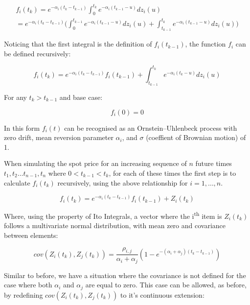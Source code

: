 \documentclass{article}
\begin{document}
\begin{eqnarray}
    \nonumber
    f_i(t_k) = e^{-\alpha_i(t_k - t_{k-1})} \int_0^{t_k} e^{-\alpha_i(t_{k-1}-u)} dz_i(u) \\
        = e^{-\alpha_i(t_k - t_{k-1})} \biggl(\int_0^{t_{k-1}} e^{-\alpha_i(t_{k-1}-u)} dz_i(u) +
        \int_{t_{k-1}}^{t_k} e^{-\alpha_i(t_{k-1}-u)} dz_i(u) \biggr)
\end{eqnarray}

Noticing that the first integral is the definition of $f_i(t_{k-1})$, the function $f_i$ can
be defined recursively:

\begin{equation}
    f_i(t_k) = e^{-\alpha_i(t_k - t_{k-1})}f_i(t_{k-1}) + \int_{t_{k-1}}^{t_k} e^{-\alpha_i(t_k-u)} dz_i(u)
\end{equation}

For any $t_k > t_{k-1}$ and base case:

\begin{equation}
    f_i(0) = 0
\end{equation}

In this form $f_i(t)$ can be recognised as an Ornstein–Uhlenbeck process with zero drift,
mean reversion parameter $\alpha_i$, and $\sigma$ (coeffient of Brownian motion) of 1.

\bigskip

When simulating the spot price for an increasing sequence of $n$
future times $t_1, t_2 \hdots t_{n-1}, t_n$ where $0 < t_{k-1} < t_k$, for each of these
times the first step is to calculate $f_i(t_k)$ recursively, using the above relationship %
for $i = 1, \hdots, n$.

\begin{equation}
    f_i(t_k) = e^{-\alpha_i(t_k - t_{k-1})}f_i(t_{k-1}) + Z_i(t_k)
\end{equation}

Where, using the property of Ito Integrals, a vector where the i\textsuperscript{th} item is $Z_i(t_k)$ follows a 
multivariate normal distribution, with mean zero and covariance between elements:

\begin{equation}
    cov(Z_i(t_k), Z_j(t_k)) = \frac{\rho_{i, j}}{\alpha_i + \alpha_j}(1 - 
    e^{-(\alpha_i + \alpha_j)(t_k - t_{k-1})})
\end{equation}

Similar to before, we have a situation where the covariance is not defined for the case
where both $\alpha_i$ and $\alpha_j$ are equal to zero. This case can be allowed, as
before, by redefining $cov(Z_i(t_k), Z_j(t_k))$ to it's continuous extension:
\end{document}
